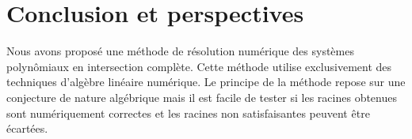 \documentclass{standalone}
\begin{document}
\section{Conclusion et perspectives}
Nous avons proposé une méthode de résolution numérique des systèmes polynômiaux en intersection complète. Cette méthode utilise exclusivement des techniques d'algèbre linéaire numérique. Le principe de la méthode repose sur une conjecture de nature algébrique mais il est facile de tester si les racines obtenues sont numériquement correctes et les racines non satisfaisantes peuvent être écartées.
\end{document}
